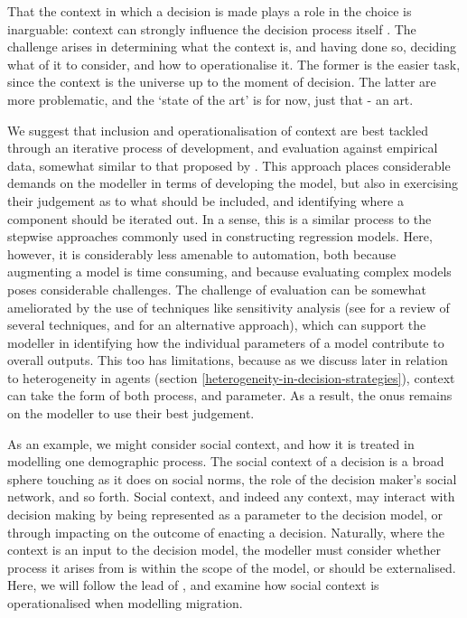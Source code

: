 \documentclass{article}
\begin{document}
That the context in which a decision is made plays a role in the choice is inarguable: context can strongly influence the decision process itself \citep{Ben-Akiva2012}. The challenge arises in determining what the context is, and having done so, deciding what of it to consider, and how to operationalise it. The former is the easier task, since the context is the universe up to the moment of decision. The latter are more problematic, and the `state of the art' is for now, just that - an art. 


We suggest that inclusion and operationalisation of context are best tackled through an iterative process of development, and evaluation against empirical data, somewhat similar to that proposed by \cite{Cioffi-Revilla2010}. This approach places considerable demands on the modeller in terms of developing the model, but also in exercising their judgement as to what should be included, and identifying where a component should be iterated out. In a sense, this is a similar process to the stepwise approaches commonly used in constructing regression models. Here, however, it is considerably less amenable to automation, both because augmenting a model is time consuming, and because evaluating complex models poses considerable challenges. The challenge of evaluation can be somewhat ameliorated by the use of techniques like sensitivity analysis (see \citet{Thiele2014} for a review of several techniques, and \citet{Oakley2004} for an alternative approach), which can support the modeller in identifying how the individual parameters of a model contribute to overall outputs. This too has limitations, because as we discuss later in relation to heterogeneity in agents (section \ref{heterogeneity-in-decision-strategies}), context can take the form of both process, and parameter.
As a result, the onus remains on the modeller to use their best judgement.

As an example, we might consider social context, and how it is treated in modelling one demographic process. The social context of a decision is a broad sphere touching as it does on social norms, the role of the decision maker's social network, and so forth. Social context, and indeed any context, may interact with decision making by being represented as a parameter to the decision model, or through impacting on the outcome of enacting a decision. Naturally, where the context is an input to the decision model, the modeller must consider whether process it arises from is within the scope of the model, or should be externalised.
Here, we will follow the lead of \citet{Klabunde}, and examine how social context is operationalised when modelling migration. 
\end{document}
